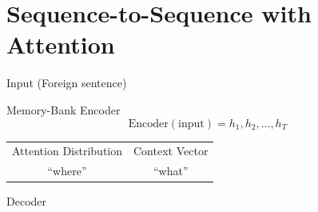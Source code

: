 \documentclass{beamer}
\newcommand{\air}{\vspace{0.25cm}}
\begin{document}
\section{Sequence-to-Sequence with Attention}


\begin{frame}
  \begin{center}
    \air


    Input (Foreign sentence) 

    \air 

    \arrowdown  
    \air 

    Memory-Bank Encoder
    \[\text{Encoder}(\text{input}) = h_1, h_2, \dots, h_T  \]

    \air

\pause \arrowdown  

    \air

    \begin{tabular}{cc}
 Attention Distribution  & Context Vector  \\
``where'' & ``what'' \\ 
    \end{tabular}

\air
 
\pause \arrowdown  

    \air

Decoder





  \end{center}
\end{frame}
\end{document}
